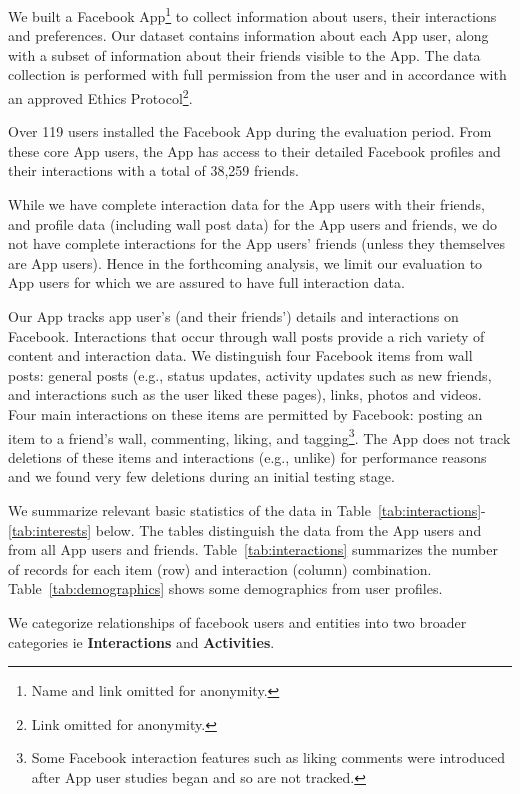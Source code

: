 
We built a Facebook App\footnote{Name and link omitted
for anonymity.} to collect information about users, 
their interactions and preferences.  
Our dataset contains information about each App user, along with a
subset of information about their friends visible to the App.  The
data collection is performed with full permission from the user and in
accordance with an approved Ethics Protocol\footnote{Link omitted for
anonymity.}.

Over 119 users installed the Facebook App during the
evaluation period. From these core App users, the App has access to their
detailed Facebook profiles and their interactions with a total of
38,259 friends.

While we have complete interaction data for the App
users with their friends, and profile data (including
wall post data) for the App users and friends, we do not have complete
interactions for the App users' friends (unless they themselves are
App users).  Hence in the forthcoming analysis, we limit our
evaluation to App users for which we are assured to have full
interaction data.

Our App tracks app user's (and their friends') details and interactions
on Facebook.  Interactions that occur through wall posts provide a
rich variety of content and interaction data.  We distinguish four
Facebook items from wall posts: general posts (e.g., status updates,
activity updates such as new friends, and interactions such as the
user liked these pages), links, photos and videos. Four main
interactions on these items are permitted by Facebook: posting an item
to a friend's wall, commenting, liking, and tagging\footnote{Some
Facebook interaction features such as liking comments were introduced
after App user studies began and so are not tracked.}.  The App does
not track deletions of these items and interactions (e.g., unlike) for
performance reasons and we found very few deletions during an initial
testing stage.

We summarize relevant basic statistics of the data in Table~\ref{tab:interactions}-\ref{tab:interests} below.
The tables distinguish the data from the App users and from
all App users and friends. Table~\ref{tab:interactions}
summarizes the number of records for each item (row) and interaction (column)
combination. Table~\ref{tab:demographics} shows 
some demographics from user profiles.

We categorize relationships of facebook users and entities into two broader categories ie \textbf{Interactions} and \textbf{Activities}.

